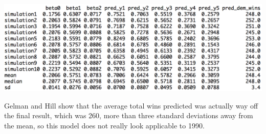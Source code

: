 \documentclass[a4paper, 11pt]{article}
\begin{document}
\begin{center}
\includegraphics[scale=0.7]{plot_ex4_5.png}
\end{center}
Gelman and Hill show that the average total wins predicted was actually way off the final result, which was 260, more than three standard deviations away from the mean, so this model does not really look applicable to 1990.
\end{document}
